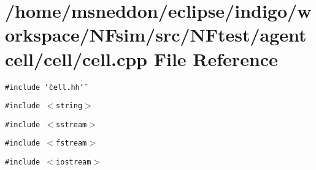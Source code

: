 \section{/home/msneddon/eclipse/indigo/workspace/NFsim/src/NFtest/agentcell/cell/cell.cpp File Reference}
\label{cell_8cpp}


{\tt \#include \char`\"{}cell.hh\char`\"{}}\par
{\tt \#include $<$string$>$}\par
{\tt \#include $<$sstream$>$}\par
{\tt \#include $<$fstream$>$}\par
{\tt \#include $<$iostream$>$}\par
